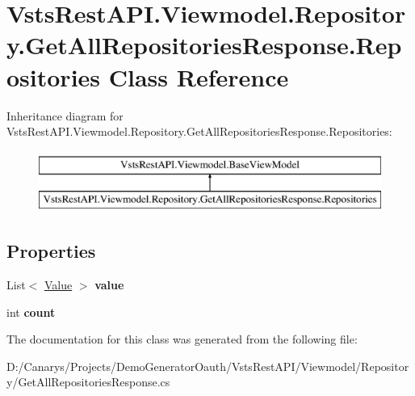 \hypertarget{class_vsts_rest_a_p_i_1_1_viewmodel_1_1_repository_1_1_get_all_repositories_response_1_1_repositories}{}\section{Vsts\+Rest\+A\+P\+I.\+Viewmodel.\+Repository.\+Get\+All\+Repositories\+Response.\+Repositories Class Reference}
\label{class_vsts_rest_a_p_i_1_1_viewmodel_1_1_repository_1_1_get_all_repositories_response_1_1_repositories}
Inheritance diagram for Vsts\+Rest\+A\+P\+I.\+Viewmodel.\+Repository.\+Get\+All\+Repositories\+Response.\+Repositories\+:\begin{figure}[H]
\begin{center}
\leavevmode
\includegraphics[height=2.000000cm]{class_vsts_rest_a_p_i_1_1_viewmodel_1_1_repository_1_1_get_all_repositories_response_1_1_repositories}
\end{center}
\end{figure}
\subsection*{Properties}
\begin{DoxyCompactItemize}
\item 
\mbox{\label{class_vsts_rest_a_p_i_1_1_viewmodel_1_1_repository_1_1_get_all_repositories_response_1_1_repositories_abf5161f2d81fe7fb5d944c52f3be2463}} 
List$<$ \mbox{\hyperlink{class_vsts_rest_a_p_i_1_1_viewmodel_1_1_repository_1_1_get_all_repositories_response_1_1_value}{Value}} $>$ {\bfseries value}
\item 
\mbox{\label{class_vsts_rest_a_p_i_1_1_viewmodel_1_1_repository_1_1_get_all_repositories_response_1_1_repositories_a63e9e77dd4b94359e306fe90d091d883}} 
int {\bfseries count}
\end{DoxyCompactItemize}


The documentation for this class was generated from the following file\+:\begin{DoxyCompactItemize}
\item 
D\+:/\+Canarys/\+Projects/\+Demo\+Generator\+Oauth/\+Vsts\+Rest\+A\+P\+I/\+Viewmodel/\+Repository/Get\+All\+Repositories\+Response.\+cs\end{DoxyCompactItemize}
